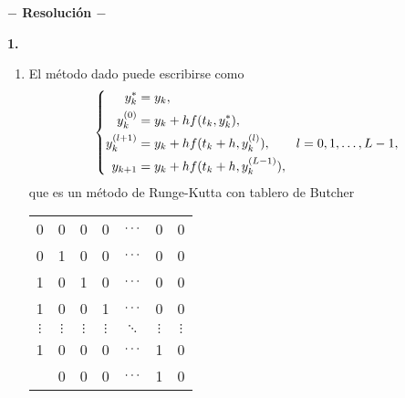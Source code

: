 \documentclass[11pt]{report}
\begin{document}




\begin{center}

	\textbf{$-$ Resolución $-$}

\end{center}


\textbf{1. }

\begin{enumerate}
    \item El método dado puede escribirse como 
    \[\left\{ \begin{alignedat}{1}
        y_k^* &= y_k, \\
        y_{k}^{(0)} &= y_k+hf(t_k,y_k^*), \\
        y_{k}^{(l+1)} &= y_k+hf(t_k+h, y_{k}^{(l)}), \qquad l = 0,1,\mathellipsis,L-1, \\
        y_{k+1} &= y_{k}+hf(t_k+h,y_{k}^{(L-1)}),
    \end{alignedat} \right.\]
    que es un método de Runge-Kutta con tablero de Butcher

    \begin{center}
        \setlength\extrarowheight{2.5pt}
        \begin{tabular}{c|cccccc}
            0 & 0 & 0 & 0 & $\mathellipsis$ & 0 & 0 \\
            0 & 1 & 0 & 0 & $\mathellipsis$ & 0 & 0 \\
            1 & 0 & 1 & 0 & $\mathellipsis$ & 0 & 0 \\
            1 & 0 & 0 & 1 & $\mathellipsis$ & 0 & 0 \\
            $\vdots$ & $\vdots$ & $\vdots$ & $\vdots$ & $\ddots$ & $\vdots$ & $\vdots$ \\
            1 & 0 & 0 & 0 & $\mathellipsis$ & 1 & 0 \\ \hline
            & 0 & 0 & 0 & $\mathellipsis$ & 1 & 0 
        \end{tabular}
    \end{center}


\end{enumerate}
\end{document}
